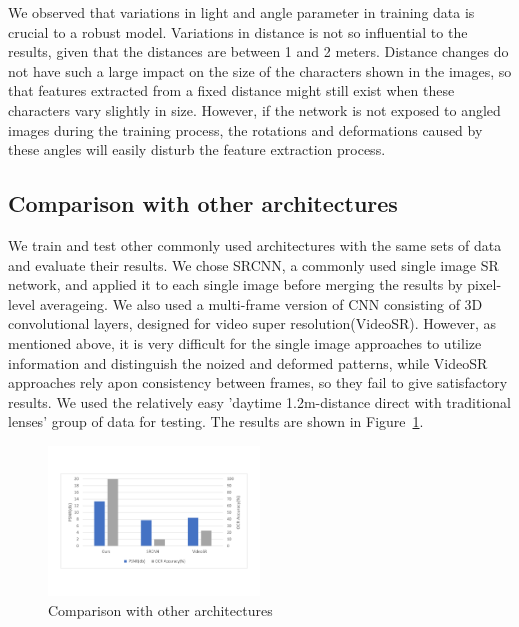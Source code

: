 We observed that variations in light and angle parameter in training data is crucial to a robust model. Variations in distance is not so influential to the results, given that the distances are between 1 and 2 meters. Distance changes do not have such a large impact on the size of the characters shown in the images, so that features extracted from a fixed distance might still exist when these characters vary slightly in size. However, if the network is not exposed to angled images during the training process, the rotations and deformations caused by these angles will easily disturb the feature extraction process.

\subsection{Comparison with other architectures}
We train and test other commonly used architectures with the same sets of data and evaluate their results. We chose SRCNN, a commonly used single image SR network, and applied it to each single image before merging the results by pixel-level averageing. We also used a multi-frame version of CNN consisting of 3D convolutional layers, designed for video super resolution(VideoSR). However, as mentioned above, it is very difficult for the single image approaches to utilize information and distinguish the noized and deformed patterns, while VideoSR approaches rely apon consistency between frames, so they fail to give satisfactory results. We used the relatively easy 'daytime 1.2m-distance direct with traditional lenses' group of data for testing. The results are shown in Figure~\ref{table-comp}.

\begin{figure}
 \centering
    \includegraphics[width=0.5\textwidth]{./pic/table4.pdf}
    \caption{Comparison with other architectures}
    \label{table-comp}
\end{figure}

